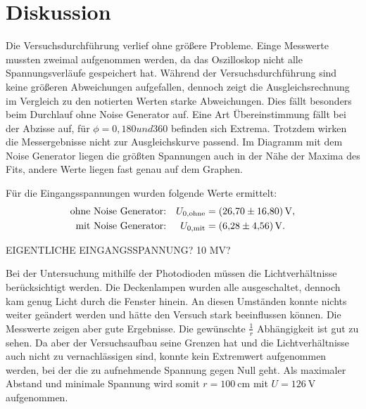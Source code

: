 \section{Diskussion}
\label{sec:Diskussion}

Die Versuchsdurchführung verlief ohne größere Probleme.
Einge Messwerte mussten zweimal aufgenommen werden, da das Oszilloskop nicht alle Spannungsverläufe gespeichert hat.
Während der Versuchsdurchführung sind keine größeren Abweichungen aufgefallen, dennoch zeigt die Ausgleichsrechnung im Vergleich zu den notierten Werten starke Abweichungen.
Dies fällt besonders beim Durchlauf ohne Noise Generator auf.
Eine Art Übereinstimmung fällt bei der Abzisse auf, für $\phi = 0 , 180 und 360$ befinden sich Extrema.
Trotzdem wirken die Messergebnisse nicht zur Ausgleichskurve passend.
Im Diagramm mit dem Noise Generator liegen die größten Spannungen auch in der Nähe der Maxima des Fits, andere Werte liegen fast genau auf dem Graphen.

\noindent
Für die Eingangsspannungen wurden folgende Werte ermittelt:
\begin{align*}
    \text{ohne Noise Generator:}&  &U_{0,\text{ohne}} &= \SI{26.70 \pm 16.80}{\volt}, \\
    \text{mit Noise Generator:}&   &U_{0,\text{mit}} &= \SI{ 6.28 \pm 4.56}{\volt}.
\end{align*}

EIGENTLICHE EINGANGSSPANNUNG? 10 MV? 

\noindent
Bei der Untersuchung mithilfe der Photodioden müssen die Lichtverhältnisse berücksichtigt werden.
Die Deckenlampen wurden alle ausgeschaltet, dennoch kam genug Licht durch die Fenster hinein.
An diesen Umständen konnte nichts weiter geändert werden und hätte den Versuch stark beeinflussen können.
Die Messwerte zeigen aber gute Ergebnisse.
Die gewünschte $\frac{1}{r}$ Abhängigkeit ist gut zu sehen.
Da aber der Versuchsaufbau seine Grenzen hat und die Lichtverhältnisse auch nicht zu vernachlässigen sind,
konnte kein Extremwert aufgenommen werden, bei der die zu aufnehmende Spannung gegen Null geht.
Als maximaler Abstand und minimale Spannung wird somit $r = \SI{100}{\centi\metre}$ mit $U = \SI{126}{\volt}$ aufgenommen.

